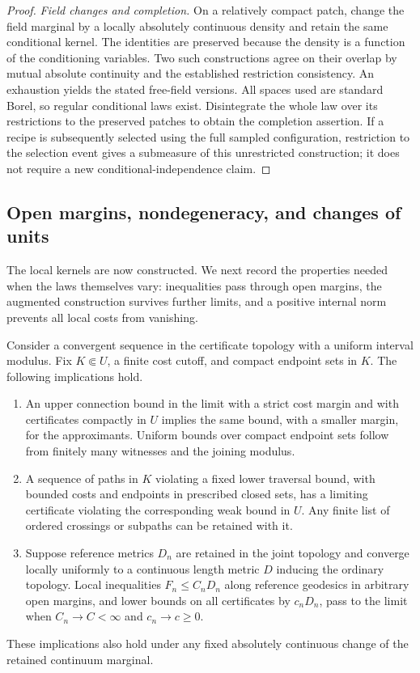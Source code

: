 \begin{proof}
\emph{Field changes and completion.}
On a relatively compact patch, change the field marginal by a locally
absolutely continuous density and retain the same conditional kernel.
The identities are preserved because the density is a function of
the conditioning variables.  Two such constructions agree on their
overlap by mutual absolute continuity and the established restriction
consistency.  An exhaustion yields the stated free-field versions.
All spaces used are standard Borel, so regular conditional laws exist.
Disintegrate the whole law over its restrictions to the preserved
patches to obtain the completion assertion.  If a recipe is subsequently
selected using the full sampled configuration, restriction to the
selection event gives a submeasure of this unrestricted construction;
it does not require a new conditional-independence claim.
\end{proof}

\subsection{Open margins, nondegeneracy, and changes of units}

The local kernels are now constructed. We next record the properties
needed when the laws themselves vary: inequalities pass through open
margins, the augmented construction survives further limits, and a
positive internal norm prevents all local costs from vanishing.

\begin{lemma}\label{tree:lem:certificate_buffered_tests}
Consider a convergent sequence in the certificate topology with a
uniform interval modulus.  Fix $K\Subset U$, a finite cost cutoff,
and compact endpoint sets in $K$.  The following implications hold.
\begin{enumerate}
\item An upper connection bound in the limit with a strict cost
margin and with certificates compactly in $U$ implies the same bound,
with a smaller margin, for the approximants.  Uniform bounds over
compact endpoint sets follow from finitely many witnesses and the
joining modulus.
\item A sequence of paths in $K$ violating a fixed lower traversal
bound, with bounded costs and endpoints in prescribed closed sets,
has a limiting certificate violating the corresponding weak bound
in $U$.  Any finite list of ordered crossings or subpaths can be
retained with it.
\item Suppose reference metrics $D_n$ are retained in the joint
topology and converge locally uniformly to a continuous length
metric $D$ inducing the ordinary topology.  Local inequalities
$F_n\leq C_nD_n$ along reference geodesics in arbitrary open margins,
and lower bounds on all certificates by $c_nD_n$, pass to the limit
when $C_n\to C<\infty$ and $c_n\to c\geq0$.
\end{enumerate}
These implications also hold under any fixed absolutely continuous
change of the retained continuum marginal.
\end{lemma}


